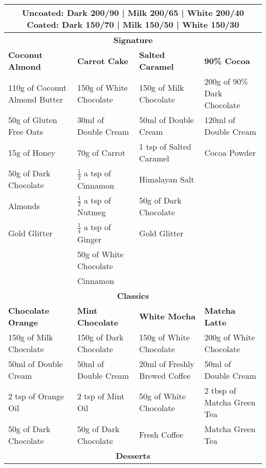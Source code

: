 \documentclass[11pt, english]{article}
\begin{document}
	\begin{center}
		\scriptsize
	\begin{longtable}{p{3.75cm}p{3.75cm}p{3.75cm}p{3.75cm}}
	        \multicolumn{4}{c}{\textbf{Uncoated:} Dark 200/90 | Milk 200/65 | White 200/40 \textbf{Coated:} Dark 150/70 | Milk 150/50 | White 150/30}\\
	        \hline
	        \hline
	        \multicolumn{4}{c}{\textbf{Signature}}\\
	        \hline
	        \hline
	        \textbf{Coconut Almond} & \textbf{Carrot Cake} & \textbf{Salted Caramel} & \textbf{90\% Cocoa}\\
	        \hline
	        110g of Coconut Almond Butter & 150g of White Chocolate & 150g of Milk Chocolate & 200g of 90\% Dark Chocolate\\
	        50g of Gluten Free Oats & 30ml of Double Cream & 50ml of Double Cream & 120ml of Double Cream\\
	        15g of Honey & 70g of Carrot & 1 tsp of Salted Caramel & Cocoa Powder\\
	        50g of Dark Chocolate & $\frac{1}{2}$ a tsp of Cinnamon & Himalayan Salt & \\
	        Almonds & $\frac{1}{2}$ a tsp of Nutmeg & 50g of Dark Chocolate & \\
	        Gold Glitter & $\frac{1}{4}$ a tsp of Ginger & Gold Glitter & \\
	        & 50g of White Chocolate & & \\
	        & Cinnamon & & \\
	        \hline
	        \hline
	        \multicolumn{4}{c}{\textbf{Classics}}\\
	        \hline
	        \hline
	        \textbf{Chocolate Orange} & \textbf{Mint Chocolate} & \textbf{White Mocha} & \textbf{Matcha Latte}\\
	        \hline
		150g of Milk Chocolate & 150g of Dark Chocolate & 150g of White Chocolate & 200g of White Chocolate\\
	        50ml of Double Cream & 50ml of Double Cream & 20ml of Freshly Brewed Coffee & 50ml of Double Cream\\
	        2 tsp of Orange Oil & 2 tsp of Mint Oil & 50g of White Chocolate & 2 tbsp of Matcha Green Tea\\
	        50g of Dark Chocolate & 50g of Dark Chocolate & Fresh Coffee & Matcha Green Tea\\
	        \hline
	        \hline
	        \multicolumn{4}{c}{\textbf{Desserts}}\\

\end{longtable}
\end{center}
\end{document}
